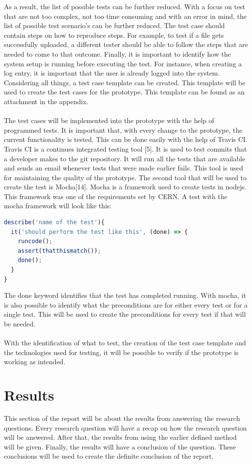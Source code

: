 \documentclass[paper=a4, fontsize=11pt,twoside]{scrartcl}	%
\begin{document}
As a result, the list of possible tests can be further reduced. With a focus on test that are not too complex, not too time consuming and with an error in mind, the list of possible test scenario's can be further reduced.  The test case should contain steps on how to reproduce steps. For example, to test if a file gets successfully uploaded, a different tester should be able to follow the steps that are needed to come to that outcome. Finally, it is important to identify how the system setup is running before executing the test. For instance, when creating a log entry, it is important that the user is already logged into the system. Considering all things, a test case template can be created. This template will be used to create the test cases for the prototype. This template can be found as an attachment in the appendix. \\ \\
The test cases will be implemented into the prototype with the help of programmed tests. It is important that, with every change to the prototype, the current functionality is tested. This can be done easily with the help of Travis CI. Travis CI is a continues integrated testing tool [5]. It is used to test commits that a developer makes to the git repository. It will run all the tests that are available and sends an email whenever tests that were made earlier fails. This tool is used for maintaining the quality of the prototype. The second tool that will be used to create the test is Mocha[14]. Mocha is a framework used to create tests in nodejs. This framework was one of the requirements set by CERN. A test with the mocha framework will look like this:
\begin{lstlisting}[language=JavaScript, frame=single]
describe('name of the test'){
  it('should perform the test like this', (done) => {
    runcode();
    assert(thatthismatch());
    done();
  }
}
\end{lstlisting} 
The done keyword identifies that the test has completed running. With mocha, it is also possible to identify what the preconditions are for either every test or for a single test. This will be used to create the preconditions for every test if that will be needed.\\ \\
With the identification of what to test, the creation of the test case template and the technologies used for testing, it will be possible to verify if the prototype is working as intended.
\newpage
\section{Results}
This section of the report will be about the results from answering the research questions. Every research question will have a recap on how the research question will be answered. After that, the results from using the earlier defined method will be given. Finally, the results will have a conclusion of the question. These conclusions will be used to create the definite conclusion of the report.
\newpage
\end{document}
